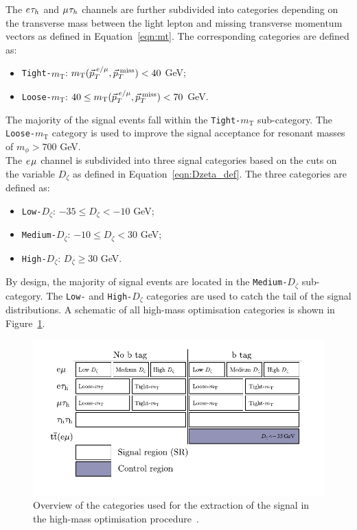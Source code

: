 The $e_{}\tau_{h}$ and $\mu_{}\tau_{h}$ channels are further subdivided into categories depending on the transverse mass between the light lepton and missing transverse momentum vectors as defined in Equation~\ref{eqn:mt}.
The corresponding categories are defined as:
\begin{itemize}
\item \texttt{Tight-$m_{\text{T}}$}: $m_{\text{T}}(\vec{p}_{T}^{\hspace{2pt}e/\mu},\vec{p}_{T}^{\hspace{2pt}\text{miss}}) < 40$ GeV;
\item \texttt{Loose-$m_{\text{T}}$}: $40 \leq m_{\text{T}}(\vec{p}_{T}^{\hspace{2pt}e/\mu},\vec{p}_{T}^{\hspace{2pt}\text{miss}}) < 70$ GeV.
\end{itemize}
The majority of the signal events fall within the \texttt{Tight-$m_{\text{T}}$} sub-category.
The \texttt{Loose-$m_{\text{T}}$} category is used to improve the signal acceptance for resonant masses of $m_{\phi} > 700$ GeV.\\

The $e_{}\mu_{}$ channel is subdivided into three signal categories based on the cuts on the variable $D_{\zeta}$ as defined in Equation~\ref{eqn:Dzeta_def}.
The three categories are defined as:
\begin{itemize}
\item \texttt{Low-$D_\zeta$}: $-35 \leq D_\zeta < -10$ GeV;
\item \texttt{Medium-$D_\zeta$}: $-10 \leq D_\zeta <  30$ GeV;
\item \texttt{High-$D_\zeta$}: $D_\zeta \geq 30$ GeV.
\end{itemize}
By design, the majority of signal events are located in the \texttt{Medium-$D_\zeta$} sub-category.
The \texttt{Low-} and \texttt{High-$D_\zeta$} categories are used to catch the tail of the signal distributions.
A schematic of all high-mass optimisation categories is shown in Figure~\ref{fig:high_mass_categories}. \\

\begin{figure}[t]
\centering
    \includegraphics[width=\textwidth]{Figures/high_mass_categories.pdf}
\caption[Diagram of the categories in the high-mass optimisation procedure.]{Overview of the categories used for the extraction of the signal in the high-mass optimisation procedure~\cite{CMS:2022rbd}.}
\label{fig:high_mass_categories}
\end{figure}

